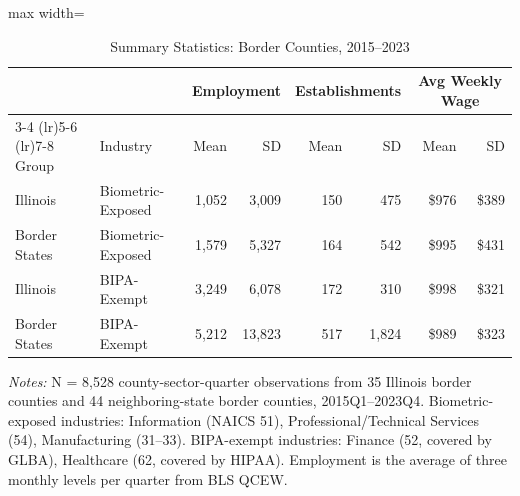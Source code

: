 \begin{table}[H]
\centering
\caption{Summary Statistics: Border Counties, 2015--2023}
\label{tab:summary}
\begin{threeparttable}
\begin{adjustbox}{max width=\textwidth}
\begin{tabular}{llrrrrrr}
\toprule
 & & \multicolumn{2}{c}{Employment} & \multicolumn{2}{c}{Establishments} & \multicolumn{2}{c}{Avg Weekly Wage} \\
\cmidrule(lr){3-4} \cmidrule(lr){5-6} \cmidrule(lr){7-8}
Group & Industry & Mean & SD & Mean & SD & Mean & SD \\
\midrule
Illinois & Biometric-Exposed & 1,052 & 3,009 & 150 & 475 & \$976 & \$389 \\
Border States & Biometric-Exposed & 1,579 & 5,327 & 164 & 542 & \$995 & \$431 \\
Illinois & BIPA-Exempt & 3,249 & 6,078 & 172 & 310 & \$998 & \$321 \\
Border States & BIPA-Exempt & 5,212 & 13,823 & 517 & 1,824 & \$989 & \$323 \\
\bottomrule
\end{tabular}
\end{adjustbox}
\begin{tablenotes}[flushleft]
\small
\item \textit{Notes:} N = 8,528 county-sector-quarter observations from 35 Illinois border counties and 44 neighboring-state border counties, 2015Q1--2023Q4. Biometric-exposed industries: Information (NAICS 51), Professional/Technical Services (54), Manufacturing (31--33). BIPA-exempt industries: Finance (52, covered by GLBA), Healthcare (62, covered by HIPAA). Employment is the average of three monthly levels per quarter from BLS QCEW.
\end{tablenotes}
\end{threeparttable}
\end{table}


